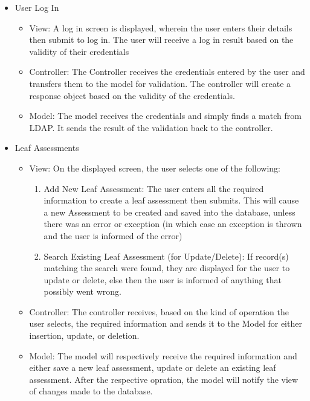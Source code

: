 \documentclass[12pt]{article}
\begin{document}
				\begin{itemize}
					\item User Log In
						\begin{itemize}
						\item View: A log in screen is displayed, wherein the user enters their details then submit to log in. The user will receive a log in result based on the validity of their credentials
						\item Controller: The Controller receives the credentials entered by the user and transfers them to the model for validation. The controller will create a response object based on the validity of the credentials.
						\item Model: The model receives the credentials and simply finds a match from LDAP. It sends the result of the validation back to the controller.
						\end{itemize}
						
					\item Leaf Assessments
					\begin{itemize}
						\item View: On the displayed screen, the user selects one of the following:
						\begin{enumerate}
							\item Add New Leaf Assessment: The user enters all the required information to create a leaf assessment then submits. This will cause a new Assessment to be created and saved into the database, unless there was an error or exception (in which case an exception is thrown and the user is informed of the error)
							\item Search Existing Leaf Assessment (for Update/Delete): If record(s) matching the search were found, they are displayed for the user to update or delete, else then the user is informed of anything that possibly went wrong.
						\end{enumerate}
						\item Controller: The controller receives, based on the kind of operation the user selects, the required information and sends it to the Model for either insertion, update, or deletion.
						\item Model: The model will respectively receive the required information and either save a new leaf assessment, update or delete an existing leaf assessment. After the respective opration, the model will notify the view of changes made to the database.
						 

\end{itemize}
\end{itemize}
\end{document}
